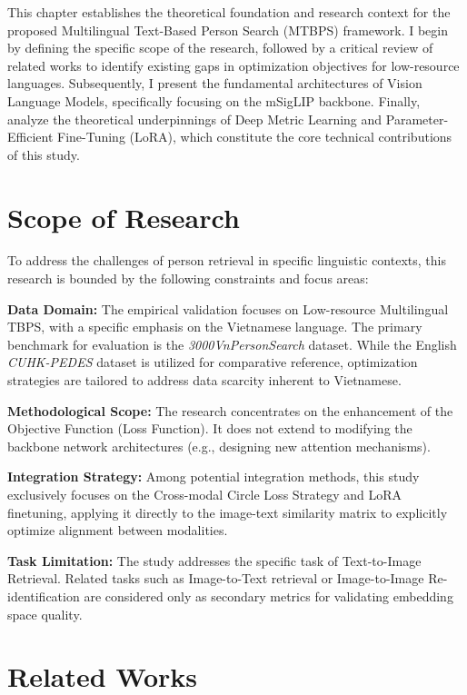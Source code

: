 \documentclass[../main.tex]{subfiles}
\begin{document}
This chapter establishes the theoretical foundation and research context for the proposed Multilingual Text-Based Person Search (MTBPS) framework. I begin by defining the specific scope of the research, followed by a critical review of related works to identify existing gaps in optimization objectives for low-resource languages. Subsequently, I present the fundamental architectures of Vision Language Models, specifically focusing on the mSigLIP backbone. Finally,  analyze the theoretical underpinnings of Deep Metric Learning and Parameter-Efficient Fine-Tuning (LoRA), which constitute the core technical contributions of this study.

\section{Scope of Research}
To address the challenges of person retrieval in specific linguistic contexts, this research is bounded by the following constraints and focus areas:

\noindent \textbf{Data Domain:} The empirical validation focuses on Low-resource Multilingual TBPS, with a specific emphasis on the Vietnamese language. The primary benchmark for evaluation is the \textit{3000VnPersonSearch} dataset. While the English \textit{CUHK-PEDES} dataset is utilized for comparative reference, optimization strategies are tailored to address data scarcity inherent to Vietnamese.

\noindent \textbf{Methodological Scope:} The research concentrates on the enhancement of the Objective Function (Loss Function). It does not extend to modifying the backbone network architectures (e.g., designing new attention mechanisms).

\noindent \textbf{Integration Strategy:} Among potential integration methods, this study exclusively focuses on the Cross-modal Circle Loss Strategy and LoRA finetuning, applying it directly to the image-text similarity matrix to explicitly optimize alignment between modalities.
 
\noindent \textbf{Task Limitation:} The study addresses the specific task of Text-to-Image Retrieval. Related tasks such as Image-to-Text retrieval or Image-to-Image Re-identification are considered only as secondary metrics for validating embedding space quality.


\section{Related Works}
\end{document}
